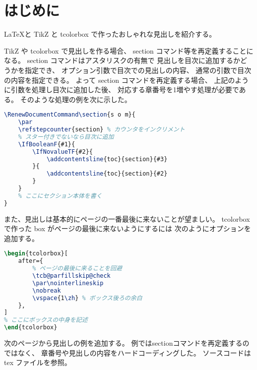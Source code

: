 \documentclass[a4paper]{ltjsarticle}
\begin{document}
\section*{はじめに}

\LaTeX と TikZ と tcolorbox で作ったおしゃれな見出しを紹介する。

TikZ や tcolorbox で見出しを作る場合、
section コマンド等を再定義することになる。
section コマンドはアスタリスクの有無で
見出しを目次に追加するかどうかを指定でき、
オプション引数で目次での見出しの内容、
通常の引数で目次の内容を指定できる。
よって section コマンドを再定義する場合、
上記のように引数を処理し目次に追加した後、
対応する章番号を1増やす処理が必要である。
そのような処理の例を次に示した。

\begin{lstlisting}[language=tex]
% \usepackage{xparse}
\RenewDocumentCommand\section{s o m}{
    \par
    \refstepcounter{section} % カウンタをインクリメント
    % スター付きでないなら目次に追加
    \IfBooleanF{#1}{
        \IfNovalueTF{#2}{
            \addcontentsline{toc}{section}{#3}
        }{
            \addcontentsline{toc}{section}{#2}
        }
    }
    % ここにセクション本体を書く
}
\end{lstlisting}

また、見出しは基本的にページの一番最後に来ないことが望ましい。
tcolorbox で作った box がページの最後に来ないようにするには
次のようにオプションを追加する。

\begin{lstlisting}[language=tex]
\begin{tcolorbox}[
    after={
        % ページの最後に来ることを回避
        \tcb@parfillskip@check
        \par\nointerlineskip
        \nobreak
        \vspace{1\zh} % ボックス後ろの余白
    },
]
% ここにボックスの中身を記述
\end{tcolorbox}
\end{lstlisting}

次のページから見出しの例を追加する。
例ではsectionコマンドを再定義するのではなく、
章番号や見出しの内容をハードコーディングした。
ソースコードは tex ファイルを参照。

\clearpage

\noindent
{}
\end{document}
